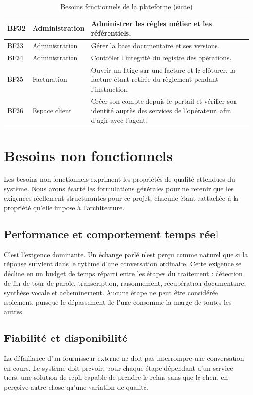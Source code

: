 \begin{table}[H]
\begin{tabular}{|p{1.3cm}|p{3.4cm}|p{9.2cm}|}
\hline
BF32 & Administration & Administrer les règles métier et les référentiels. \\
\hline
BF33 & Administration & Gérer la base documentaire et ses versions. \\
\hline
BF34 & Administration & Contrôler l'intégrité du registre des opérations. \\
\hline
BF35 & Facturation & Ouvrir un litige sur une facture et le clôturer, la facture étant retirée du règlement pendant l'instruction. \\
\hline
BF36 & Espace client & Créer son compte depuis le portail et vérifier son identité auprès des services de l'opérateur, afin d'agir avec l'agent. \\
\hline
\end{tabular}
\caption{Besoins fonctionnels de la plateforme (suite)}
\label{tab:bf-suite}
\end{table}

\section{Besoins non fonctionnels}

Les besoins non fonctionnels expriment les propriétés de qualité attendues du système. Nous avons écarté les formulations générales pour ne retenir que les exigences réellement structurantes pour ce projet, chacune étant rattachée à la propriété qu'elle impose à l'architecture.

\subsection{Performance et comportement temps réel}

C'est l'exigence dominante. Un échange parlé n'est perçu comme naturel que si la réponse survient dans le rythme d'une conversation ordinaire. Cette exigence se décline en un budget de temps réparti entre les étapes du traitement : détection de fin de tour de parole, transcription, raisonnement, récupération documentaire, synthèse vocale et acheminement. Aucune étape ne peut être considérée isolément, puisque le dépassement de l'une consomme la marge de toutes les autres.

\subsection{Fiabilité et disponibilité}

La défaillance d'un fournisseur externe ne doit pas interrompre une conversation en cours. Le système doit prévoir, pour chaque étape dépendant d'un service tiers, une solution de repli capable de prendre le relais sans que le client en perçoive autre chose qu'une variation de qualité.

